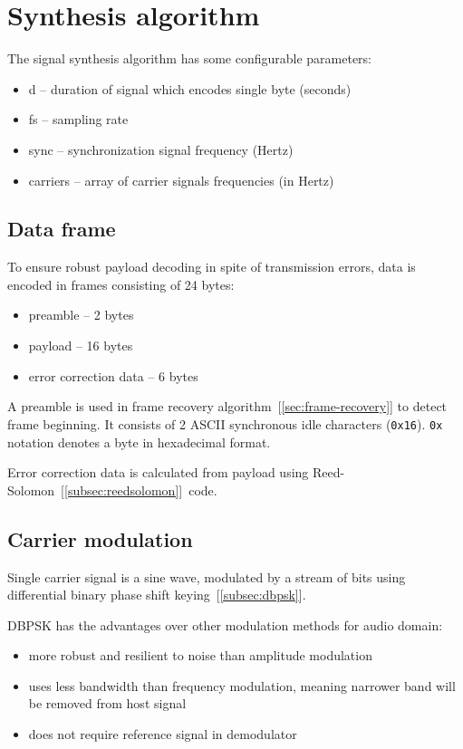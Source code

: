 \documentclass[english,bachelor,a4paper,oneside]{ppfcmthesis}
\begin{document}
\section{Synthesis algorithm}

The signal synthesis algorithm has some configurable parameters:

\begin{itemize}
\item d -- duration of signal which encodes single byte (seconds)
\item fs -- sampling rate
\item sync -- synchronization signal frequency (Hertz)
\item carriers -- array of carrier signals frequencies (in Hertz)
\end{itemize}

\subsection{Data frame}

To ensure robust payload decoding in spite of transmission errors, data is encoded in frames consisting of 24 bytes:

\begin{itemize}
\item preamble -- 2 bytes
\item payload -- 16 bytes
\item error correction data -- 6 bytes
\end{itemize}

A preamble is used in frame recovery algorithm~[\ref{sec:frame-recovery}] to detect frame beginning. It consists of 2 ASCII synchronous idle characters (\texttt{0x16}).
\texttt{0x} notation denotes a byte in hexadecimal format.

Error correction data is calculated from payload using Reed-Solomon~[\ref{subsec:reedsolomon}]~code.

\subsection{Carrier modulation}

Single carrier signal is a sine wave, modulated by a stream of bits using differential binary phase shift keying~[\ref{subsec:dbpsk}].

DBPSK has the advantages over other modulation methods for audio domain:~\cite{Applidium}

\begin{itemize}
\item more robust and resilient to noise than amplitude modulation
\item uses less bandwidth than frequency modulation, meaning narrower band will be removed from host signal
\item does not require reference signal in demodulator
\end{itemize}
\end{document}
